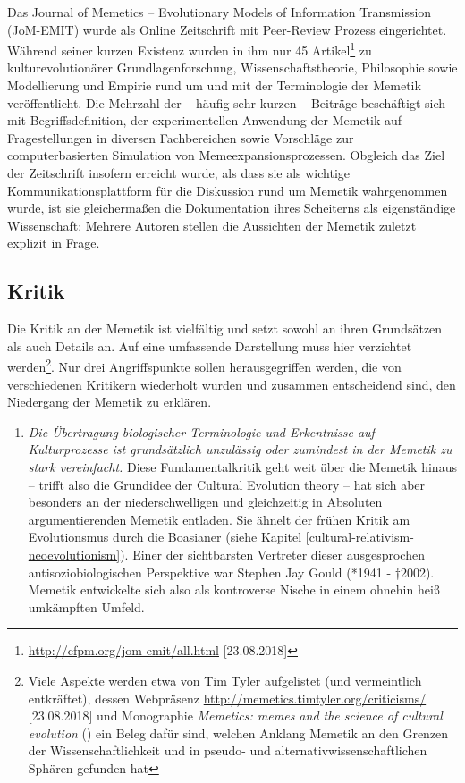 \documentclass[openany,twoside,twocolumn]{book}
\providecommand{\tightlist}{%
  \setlength{\itemsep}{0pt}\setlength{\parskip}{0pt}}
\let\rmarkdownfootnote\footnote%
\def\footnote{\protect\rmarkdownfootnote}
\begin{document}
Das Journal of Memetics -- Evolutionary Models of Information
Transmission (JoM-EMIT) wurde als Online Zeitschrift mit Peer-Review
Prozess eingerichtet. Während seiner kurzen Existenz wurden in ihm nur
45 Artikel\footnote{\url{http://cfpm.org/jom-emit/all.html}
  {[}23.08.2018{]}} zu kulturevolutionärer Grundlagenforschung,
Wissenschaftstheorie, Philosophie sowie Modellierung und Empirie rund um
und mit der Terminologie der Memetik veröffentlicht. Die Mehrzahl der --
häufig sehr kurzen -- Beiträge beschäftigt sich mit Begriffsdefinition,
der experimentellen Anwendung der Memetik auf Fragestellungen in
diversen Fachbereichen sowie Vorschläge zur computerbasierten Simulation
von Memeexpansionsprozessen. Obgleich das Ziel der Zeitschrift insofern
erreicht wurde, als dass sie als wichtige Kommunikationsplattform für
die Diskussion rund um Memetik wahrgenommen wurde, ist sie gleichermaßen
die Dokumentation ihres Scheiterns als eigenständige Wissenschaft:
Mehrere Autoren stellen die Aussichten der Memetik zuletzt explizit in
Frage.

\hypertarget{memetics-critique}{%
\subsection{Kritik}\label{memetics-critique}}

Die Kritik an der Memetik ist vielfältig und setzt sowohl an ihren
Grundsätzen als auch Details an. Auf eine umfassende Darstellung muss
hier verzichtet werden\footnote{Viele Aspekte werden etwa von Tim Tyler
  aufgelistet (und vermeintlich entkräftet), dessen Webpräsenz
  \url{http://memetics.timtyler.org/criticisms/} {[}23.08.2018{]} und
  Monographie \emph{Memetics: memes and the science of cultural
  evolution} (\textcite{tyler_memetics_2011}) ein Beleg dafür sind,
  welchen Anklang Memetik an den Grenzen der Wissenschaftlichkeit und in
  pseudo- und alternativwissenschaftlichen Sphären gefunden hat}. Nur
drei Angriffspunkte sollen herausgegriffen werden, die von verschiedenen
Kritikern wiederholt wurden und zusammen entscheidend sind, den
Niedergang der Memetik zu erklären.

\begin{enumerate}
\def\labelenumi{\arabic{enumi}.}
\tightlist
\item
  \emph{Die Übertragung biologischer Terminologie und Erkentnisse auf
  Kulturprozesse ist grundsätzlich unzulässig oder zumindest in der
  Memetik zu stark vereinfacht.} Diese Fundamentalkritik geht weit über
  die Memetik hinaus -- trifft also die Grundidee der Cultural Evolution
  theory -- hat sich aber besonders an der niederschwelligen und
  gleichzeitig in Absoluten argumentierenden Memetik entladen. Sie
  ähnelt der frühen Kritik am Evolutionsmus durch die Boasianer (siehe
  Kapitel \ref{cultural-relativism-neoevolutionism}). Einer der
  sichtbarsten Vertreter dieser ausgesprochen antisoziobiologischen
  Perspektive war Stephen Jay Gould (*1941 - †2002). Memetik entwickelte
  sich also als kontroverse Nische in einem ohnehin heiß umkämpften
  Umfeld.
\end{enumerate}
\end{document}
